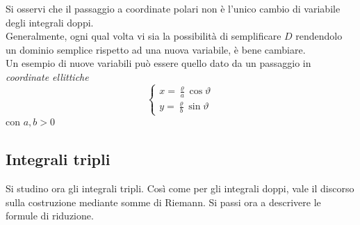\vspace*{6pt}
\begin{oss}
    Si osservi che il passaggio a coordinate polari non è l'unico cambio di variabile degli integrali doppi.\\
    Generalmente, ogni qual volta vi sia la possibilità di semplificare $D$ rendendolo un dominio semplice rispetto ad una nuova variabile, è bene cambiare.\\ 
    Un esempio di nuove variabili può essere quello dato da un passaggio in \textit{coordinate ellittiche}
    \begin{equation}
        \begin{cases}
            x=\frac{\varrho}{a} \cos \vartheta\\
            y=\frac{\varrho}{b}\sin\vartheta
        \end{cases}
    \end{equation}
    con $a,b>0$
\end{oss}
\subsection{Integrali tripli}
Si studino ora gli integrali tripli. Così come per gli integrali doppi, vale il discorso sulla costruzione mediante somme di Riemann. 
Si passi ora a descrivere le formule di riduzione.
